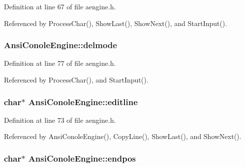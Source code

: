 Definition at line 67 of file aengine.\+h.



Referenced by Process\+Char(), Show\+Last(), Show\+Next(), and Start\+Input().

\subsubsection[{\texorpdfstring{delmode}{delmode}}]{ Ansi\+Conole\+Engine\+::delmode\hspace{0.3cm}{\ttfamily [private]}}\hypertarget{classAnsiConoleEngine_a5182d9a19cc1fe8681a9faf77a156657}{}\label{classAnsiConoleEngine_a5182d9a19cc1fe8681a9faf77a156657}


Definition at line 77 of file aengine.\+h.



Referenced by Process\+Char(), and Start\+Input().

\subsubsection[{\texorpdfstring{editline}{editline}}]{\setlength{\rightskip}{0pt plus 5cm}char$\ast$ Ansi\+Conole\+Engine\+::editline\hspace{0.3cm}{\ttfamily [private]}}\hypertarget{classAnsiConoleEngine_a465421c5488f2566d12717641a327017}{}\label{classAnsiConoleEngine_a465421c5488f2566d12717641a327017}


Definition at line 73 of file aengine.\+h.



Referenced by Ansi\+Conole\+Engine(), Copy\+Line(), Show\+Last(), and Show\+Next().

\subsubsection[{\texorpdfstring{endpos}{endpos}}]{\setlength{\rightskip}{0pt plus 5cm}char$\ast$ Ansi\+Conole\+Engine\+::endpos\hspace{0.3cm}{\ttfamily [private]}}\hypertarget{classAnsiConoleEngine_a28852245082570631c7392411fec89cc}{}\label{classAnsiConoleEngine_a28852245082570631c7392411fec89cc}


